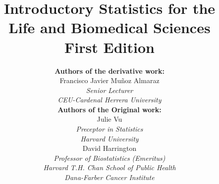 

\title{\huge Introductory Statistics for the \\ Life and Biomedical Sciences\vspace{1.5mm} \\
    \Large First Edition}


\author{
\textbf{Authors of the derivative work:} \\
Francisco Javier Muñoz Almaraz \\
\small\emph{Senior Lecturer} \\
\small\emph{CEU-Cardenal Herrera University} \vspace{6mm} \\
\textbf{Authors of the Original work:} \\
Julie Vu \\
\small\emph{Preceptor in Statistics} \\
\small\emph{Harvard University} \vspace{6mm} \\
David Harrington \\
\small\emph{Professor of Biostatistics (Emeritus)} \\
\small\emph{Harvard T.H. Chan School of Public Health} \\
\small\emph{Dana-Farber Cancer Institute}

}

